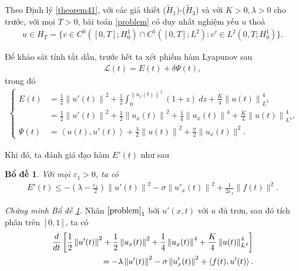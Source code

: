 \documentclass[12pt,a4paper]{article}
\newtheorem{lemma}[theorem]{Bổ đề}[section]
\theoremstyle{definition}
\theoremstyle{definition}
\begin{document}
Theo Định lý \ref{theorem41}, với các giả thiết ($\tilde{H}_1$)-($\tilde{H}_3$) và với $K > 0, \lambda > 0$ cho trước, với mọi $T > 0$, bài toán \eqref{problem} có duy nhất nghiệm yếu $u$ thoả
\begin{align}
    u \in H_T = \{ v \in C^0([0,T];H^1_0) \cap C^1([0,T];L^2) \colon v' \in L^2(0,T;H^1_0) \}.
\end{align}

Để khảo sát tính tắt dần, trước hết ta xét phiếm hàm Lyapunov sau
\begin{align}
    \mathcal{L}(t) = E(t) + \delta \Psi(t),
\end{align}
trong đó
\begin{align} \label{53}
\begin{cases}
    E(t) &= \displaystyle\frac{1}{2} \left\|u'(t)\right\|^2 + \frac{1}{2} \int_0^{\left\|u_x(t)\right\|^2} (1+z)\:dz + \frac{K}{4}\left\|u(t)\right\|^4_{L^4} \\
    &= \displaystyle \frac{1}{2} \left\|u'(t)\right\|^2 + \frac{1}{2} \left\|u_x(t)\right\|^2 + \frac{1}{4} \left\|u_x(t)\right\|^4 + \frac{K}{4}\left\|u(t)\right\|^4_{L^4}, \\
    \Psi(t) &= \displaystyle\left<u(t), u'(t)\right> + \frac{\lambda}{2} \left\|u(t)\right\|^2 + \frac{\sigma}{2} \|u_x(t)\|^2.
\end{cases}
\end{align}

Khi đó, ta đánh giá đạo hàm $E'(t)$ như sau

\begin{lemma} \label{lemma51}
    Với mọi $\varepsilon_1 > 0$, ta có
    \begin{align} \label{54}
        E'(t) \le -\left(\lambda - \frac{\varepsilon_1}{2}\right) \left\|u'(t)\right\|^2
        - \sigma \left\|u'_x(t)\right\|^2 + \frac{1}{2\varepsilon_1}\|f(t)\|^2.
    \end{align}
\end{lemma}

\textit{Chứng minh Bổ đề \ref{lemma51}.} Nhân $\eqref{problem}_1$ bởi $u'(x,t)$ với $u$ đủ trơn, sau đó tích phân trên $[0,1]$, ta có
\begin{align} \label{55}
    \frac{d}{dt}\left[ \frac{1}{2}\left\|u'(t)\right\|^2 + \frac{1}{2}\left\|u_x(t)\right\|^2 + \frac{1}{4}\left\|u_x(t)\right\|^4 + \frac{K}{4}\left\|u(t)\right\|^4_{L^4} \right] \\
    = -\lambda \left\|u'(t)\right\|^2 - \sigma \left\|u'_x(t)\right\|^2 + \left<f(t),u'(t)\right>. \notag
\end{align}
\end{document}
